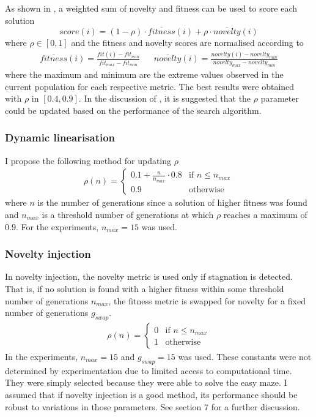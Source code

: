 As shown in \cite{novelty_not_enough}, a weighted sum of novelty and fitness can be used to score each solution
\[
    score(i) = (1-\rho) \cdot \overline{fitness}(i) + \rho \cdot \overline{novelty}(i)
\]
where $\rho \in [0,1]$ and the fitness and novelty scores are normalised according to
\begin{align*}
    \overline{fitness}(i) =  \frac{fit(i) - fit_{min}}{fit_{max} - fit_{min}} && \overline{novelty}(i) =  \frac{novelty(i) - novelty_{min}}{novelty_{max} - novelty_{min}}
\end{align*}
where the maximum and minimum are the extreme values observed in the current population for each respective metric.
The best results were obtained with $\rho$ in $[0.4,0.9]$. In the discussion of \cite{novelty_not_enough}, it is suggested
that the $\rho$ parameter could be updated based on the performance of the search algorithm.

\subsubsection{Dynamic linearisation}
\label{subsubsection:dynamic_linearisation}
I propose the following method for updating $\rho$
\begin{align*}
    \rho(n) =
        \begin{cases}
            0.1 + \frac{n}{n_{max}} \cdot 0.8 & \text{if $n \leq n_{max}$}\\
            0.9 & \text{otherwise}
        \end{cases}
\end{align*}
where $n$ is the number of generations since a solution of higher fitness was found and
$n_{max}$ is a threshold number of generations at which $\rho$ reaches a maximum
of $0.9$. For the experiments, $n_{max}=15$ was used.

\subsubsection{Novelty injection}
\label{subsection:injection}
In novelty injection, the novelty metric is used only if stagnation is detected. That is, if no solution is found with a
higher fitness within some threshold number of generations $n_{max}$, the fitness metric is swapped for novelty for a fixed
number of generations $g_{swap}$.
\begin{align*}
    \rho(n) =
        \begin{cases}
            0 & \text{if $n \leq n_{max}$}\\
            1 & \text{otherwise}
        \end{cases}
\end{align*}
In the experiments, $n_{max}=15$ and $g_{swap} = 15$ was used. These constants were not determined by experimentation due to
limited access to computational time. They were simply selected because they were able to solve the easy maze. I assumed that if novelty injection
is a good method, its performance should be robust to variations in those parameters. See section 7 for a further discussion.

